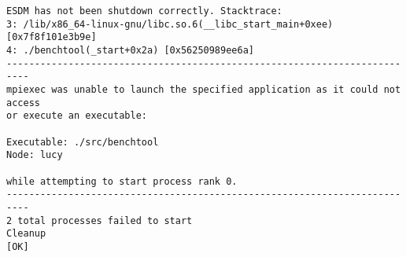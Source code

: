 \begin{verbatim}
ESDM has not been shutdown correctly. Stacktrace:
3: /lib/x86_64-linux-gnu/libc.so.6(__libc_start_main+0xee) [0x7f8f101e3b9e]
4: ./benchtool(_start+0x2a) [0x56250989ee6a]
--------------------------------------------------------------------------
mpiexec was unable to launch the specified application as it could not access
or execute an executable:

Executable: ./src/benchtool
Node: lucy

while attempting to start process rank 0.
--------------------------------------------------------------------------
2 total processes failed to start
Cleanup
[OK]
\end{verbatim}
